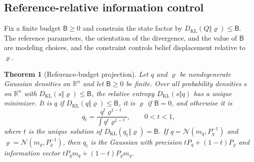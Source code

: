 \documentclass[11pt]{article}
\newtheorem{theorem}{Theorem}[section]
\theoremstyle{definition}
\theoremstyle{remark}
\providecommand{\KL}{D_{\mathrm{KL}}}
\providecommand{\N}{\mathcal{N}}
\providecommand{\R}{\mathbb{R}}
\begin{document}
\subsection{Reference-relative information control}

Fix a finite budget $\mathsf B\ge0$ and constrain the state factor by $\KL(Q\Vert\varrho)\le\mathsf B$. The reference parameters, the orientation of the divergence, and the value of $\mathsf B$ are modeling choices, and the constraint controls belief displacement relative to $\varrho$.

\begin{theorem}[Reference-budget projection]
\label{unified:pop:thm:projection}
Let $q$ and $\varrho$ be nondegenerate Gaussian densities on $\R^n$ and let $\mathsf B\ge0$ be finite. Over all probability densities $s$ on $\R^n$ with $\KL(s\Vert\varrho)\le\mathsf B$, the relative entropy $\KL(s\Vert q)$ has a unique minimizer. It is $q$ if $\KL(q\Vert\varrho)\le\mathsf B$, it is $\varrho$ if $\mathsf B=0$, and otherwise it is
\begin{equation}
q_t=\frac{q^t\varrho^{1-t}}{\int q^t\varrho^{1-t}},\qquad 0<t<1,
\label{unified:pop:eq:projection}
\end{equation}
where $t$ is the unique solution of $\KL(q_t\Vert\varrho)=\mathsf B$. If $q=\N(m_q,P_q^{-1})$ and $\varrho=\N(m_\varrho,P_\varrho^{-1})$, then $q_t$ is the Gaussian with precision $tP_q+(1-t)P_\varrho$ and information vector $tP_qm_q+(1-t)P_\varrho m_\varrho$.
\end{theorem}
\end{document}
